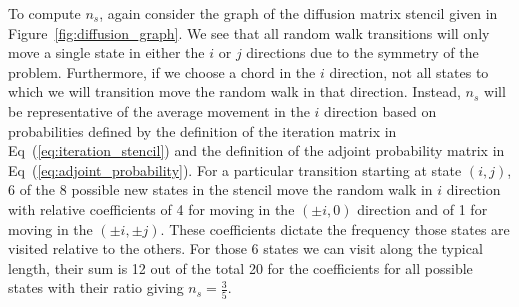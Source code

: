 \documentclass[preprint,11pt]{elsarticle}
\begin{document}
To compute $n_s$, again consider the graph of the diffusion matrix stencil
given in Figure~\ref{fig:diffusion_graph}. We see that all random walk
transitions will only move a single state in either the $i$ or $j$ directions
due to the symmetry of the problem. Furthermore, if we choose a chord in the
$i$ direction, not all states to which we will transition move the random walk
in that direction. Instead, $n_s$ will be representative of the average
movement in the $i$ direction based on probabilities defined by the definition
of the iteration matrix in Eq~(\ref{eq:iteration_stencil}) and the definition
of the adjoint probability matrix in Eq~(\ref{eq:adjoint_probability}). For a
particular transition starting at state $(i,j)$, 6 of the 8 possible new
states in the stencil move the random walk in $i$ direction with relative
coefficients of 4 for moving in the $(\pm i,0)$ direction and of 1 for moving
in the $(\pm i,\pm j)$. These coefficients dictate the frequency those states
are visited relative to the others. For those 6 states we can visit along the
typical length, their sum is 12 out of the total 20 for the coefficients for
all possible states with their ratio giving $n_s = \frac{3}{5}$.
\end{document}
